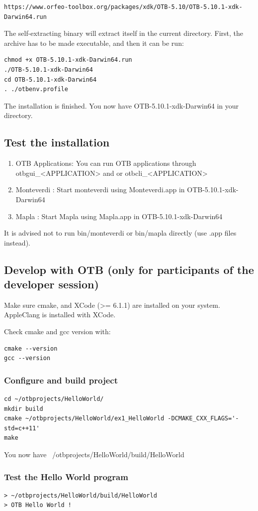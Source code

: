 \documentclass[10pt,a4paper]{article}
\begin{document}
\begin{verbatim}
https://www.orfeo-toolbox.org/packages/xdk/OTB-5.10/OTB-5.10.1-xdk-Darwin64.run
\end{verbatim}

The self-extracting binary will extract itself in the current directory. First,
the archive has to be made executable, and then it can be run:

\begin{verbatim}
chmod +x OTB-5.10.1-xdk-Darwin64.run
./OTB-5.10.1-xdk-Darwin64
cd OTB-5.10.1-xdk-Darwin64
. ./otbenv.profile
\end{verbatim}

The installation is finished. You now have OTB-5.10.1-xdk-Darwin64 in your
directory.

\subsection{Test the installation}

\begin{enumerate}
\item OTB Applications: You can run OTB applications through otbgui\_<APPLICATION> and or otbcli\_<APPLICATION> 
\item Monteverdi : Start monteverdi using Monteverdi.app in OTB-5.10.1-xdk-Darwin64
\item Mapla : Start Mapla using Mapla.app in OTB-5.10.1-xdk-Darwin64
\end{enumerate}
It is advised not to run bin/monteverdi or bin/mapla directly (use .app files instead).

\subsection{Develop with OTB (only for participants of the developer session)}
Make sure cmake, and XCode (>= 6.1.1) are installed on your system. AppleClang
is installed with XCode.

Check cmake and gcc version with:

\begin{verbatim}
cmake --version
gcc --version
\end{verbatim}

\subsubsection{Configure and build project}

\begin{verbatim}
cd ~/otbprojects/HelloWorld/
mkdir build
cmake ~/otbprojects/HelloWorld/ex1_HelloWorld -DCMAKE_CXX_FLAGS='-std=c++11'
make
\end{verbatim}

You now have ~/otbprojects/HelloWorld/build/HelloWorld

\subsubsection{Test the Hello World program}

\begin{verbatim}
> ~/otbprojects/HelloWorld/build/HelloWorld
> OTB Hello World !
\end{verbatim}
\end{document}

